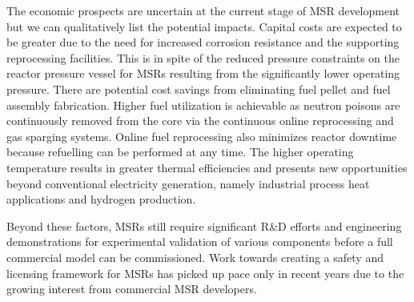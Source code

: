 The economic prospects are uncertain at the current stage of \gls{MSR}
development but we can qualitatively list the potential impacts. Capital costs
are expected to be greater due to the need for increased corrosion resistance
and the supporting reprocessing facilities. This is in spite of the reduced
pressure constraints on the reactor pressure vessel for \glspl{MSR} resulting
from the significantly lower operating pressure. There are potential cost
savings from eliminating fuel pellet and fuel assembly fabrication. Higher
fuel utilization is achievable as neutron poisons are continuously removed
from the core via the continuous online reprocessing and gas sparging systems.
Online fuel reprocessing also minimizes reactor downtime because refuelling
can be performed at any time. The higher operating temperature results in
greater thermal efficiencies and presents new opportunities beyond
conventional electricity generation, namely industrial process heat
applications and hydrogen production.

Beyond these factors, \glspl{MSR} still require significant R\&D efforts and
engineering demonstrations for experimental validation of various components
before a full commercial model can be commissioned. Work towards creating a
safety and licensing framework for \glspl{MSR} has picked up pace only in
recent years due to the growing interest from commercial \gls{MSR} developers.
